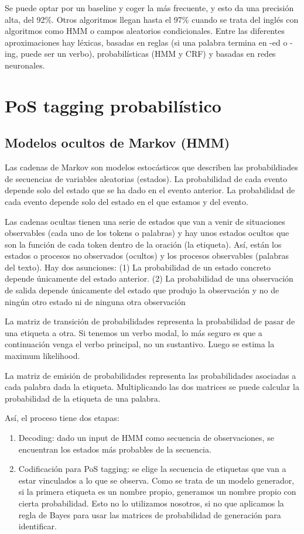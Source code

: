 Se puede optar por un baseline y coger la más frecuente, y esto da una precisión alta, del 92\%. Otros algoritmos llegan hasta el 97\% cuando se trata del inglés con algoritmos como HMM o campos aleatorios condicionales. Entre las diferentes aproximaciones hay léxicas, basadas en reglas (si una palabra termina en -ed o -ing, puede ser un verbo), probabilísticas (HMM y CRF) y basadas en redes neuronales.

\section{PoS tagging probabilístico}
\subsection{Modelos ocultos de Markov (HMM)}
Las cadenas de Markov son modelos estocásticos que describen las probabildiades de secuencias de variables aleatorias (estados). La probabilidad de cada evento depende solo del estado que se ha dado en el evento anterior. La probabilidad de cada evento depende solo del estado en el que estamos y del evento. 

Las cadenas ocultas tienen una serie de estados que van a venir de situaciones observables (cada uno de los tokens o palabras) y hay unos estados ocultos que son la función de cada token dentro de la oración (la etiqueta). Así, están los estados o procesos no observados (ocultos) y los procesos observables (palabras del texto). Hay dos asunciones: (1) La probabilidad de un estado concreto depende únicamente del estado anterior. (2) La probabilidad de una observación de salida depende únicamente del estado que produjo la observación y no de ningún otro estado ni de ninguna otra observación

La matriz de transición de probabilidades representa la probabilidad de pasar de una etiqueta a otra. Si tenemos un verbo modal, lo más seguro es que a continuación venga el verbo principal, no un sustantivo. Luego se estima la maximum likelihood. 

La matriz de emisión de probabilidades representa las probabilidades asociadas a cada palabra dada la etiqueta. Multiplicando las dos matrices se puede calcular la probabilidad de la etiqueta de una palabra. 

Así, el proceso tiene dos etapas:
\begin{enumerate}
\item Decoding: dado un input de HMM como secuencia de observaciones, se encuentran los estados más probables de la secuencia. 
\item Codificación para PoS tagging: se elige la secuencia de etiquetas que van a estar vinculados a lo que se observa. Como se trata de un modelo generador, si la primera etiqueta es un nombre propio, generamos un nombre propio con cierta probabilidad. Esto no lo utilizamos nosotros, si no que aplicamos la regla de Bayes para usar las matrices de probabilidad de generación para identificar. 
\end{enumerate}

